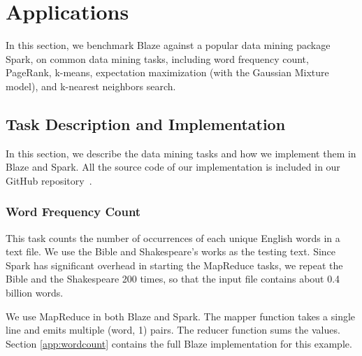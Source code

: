 \section{Applications}
\label{sec:app}

In this section, we benchmark Blaze against a popular data mining package Spark, on common data mining tasks, including word frequency count, PageRank, k-means, expectation maximization (with the Gaussian Mixture model), and k-nearest neighbors search.

\subsection{Task Description and Implementation}

In this section, we describe the data mining tasks and how we implement them in Blaze and Spark.
All the source code of our implementation is included in our GitHub repository~\cite{blaze}.

\subsubsection{Word Frequency Count}

This task counts the number of occurrences of each unique English words in a text file.
We use the Bible and Shakespeare's works as the testing text.
Since Spark has significant overhead in starting the MapReduce tasks, we repeat the Bible and the Shakespeare 200 times, so that the input file contains about 0.4 billion words.

We use MapReduce in both Blaze and Spark.
The mapper function takes a single line and emits multiple (word, 1) pairs.
The reducer function sums the values.
Section \ref{app:wordcount} contains the full Blaze implementation for this example.

